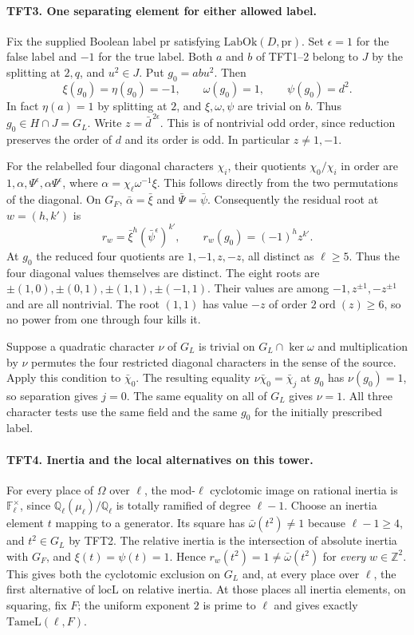 \paragraph{TFT3. One separating element for either allowed label.}
Fix the supplied Boolean label $\mathrm{pr}$ satisfying
$\mathrm{LabOk}(D,\mathrm{pr})$. Set $\epsilon=1$ for the false
label and $-1$ for the true label. Both $a$ and $b$ of TFT1--2
belong to $J$ by the splitting at $2,q$, and $u^2\in J$.
Put $g_0=a b u^2$. Then
\[
 \xi(g_0)=\eta(g_0)=-1,\qquad
 \omega(g_0)=1,\qquad \psi(g_0)=d^2 .
\]
In fact $\eta(a)=1$ by splitting at $2$, and $\xi,\omega,\psi$
are trivial on $b$. Thus $g_0\in H\cap J=G_L$. Write
$z=\bar d^{\,2\epsilon}$. This is of nontrivial odd order, since
reduction preserves the order of $d$ and its order is odd.
In particular $z\ne 1,-1$.

For the relabelled four diagonal characters $\chi_i$, their quotients
$\chi_0/\chi_i$ in order are $1,\alpha,\Psi^\epsilon,
\alpha\Psi^\epsilon$, where $\alpha=\chi_\ell\omega^{-1}\xi$.
This follows directly from the two permutations of the diagonal.
On $G_F$, $\bar\alpha=\bar\xi$ and $\bar\Psi=\bar\psi$.
Consequently the residual root at $w=(h,k')$ is
\[
 r_w=\bar\xi^h(\bar\psi^\epsilon)^{k'},\qquad
 r_w(g_0)=(-1)^h z^{k'}.
\]
At $g_0$ the reduced four quotients are $1,-1,z,-z$, all distinct
as $\ell\ge5$. Thus the four diagonal values themselves are distinct.
The eight roots are $\pm(1,0),\pm(0,1),\pm(1,1),\pm(-1,1)$.
Their values are among $-1,z^{\pm1},-z^{\pm1}$ and are all
nontrivial. The root $(1,1)$ has value $-z$ of order
$2\operatorname{ord}(z)\ge6$, so no power from one through four kills it.

Suppose a quadratic character $\nu$ of $G_L$ is trivial on
$G_L\cap\ker\omega$ and multiplication by $\nu$ permutes the four
restricted diagonal characters in the sense of the source. Apply this
condition to $\bar\chi_0$. The resulting equality
$\nu\bar\chi_0=\bar\chi_j$ at $g_0$ has $\nu(g_0)=1$, so
separation gives $j=0$. The same equality on all of $G_L$ gives
$\nu=1$. All three character tests use the same field and the
same $g_0$ for the initially prescribed label.

\paragraph{TFT4. Inertia and the local alternatives on this tower.}
For every place of $\Omega$ over $\ell$, the mod-$\ell$ cyclotomic
image on rational inertia is $\mathbb F_\ell^\times$, since
$\mathbb Q_\ell(\mu_\ell)/\mathbb Q_\ell$ is totally ramified of
degree $\ell-1$. Choose an inertia element $t$ mapping to a generator.
Its square has $\bar\omega(t^2)\ne1$ because $\ell-1\ge4$,
and $t^2\in G_L$ by TFT2. The relative inertia is the intersection
of absolute inertia with $G_F$, and $\xi(t)=\psi(t)=1$. Hence
$r_w(t^2)=1\ne\bar\omega(t^2)$ for \emph{every} $w\in\mathbb Z^2$.
This gives both the cyclotomic exclusion on $G_L$ and, at every
place over $\ell$, the first alternative of $\mathrm{locL}$ on
relative inertia. At those places all inertia elements, on squaring,
fix $F$; the uniform exponent $2$ is prime to $\ell$ and gives
exactly $\mathrm{TameL}(\ell,F)$.

